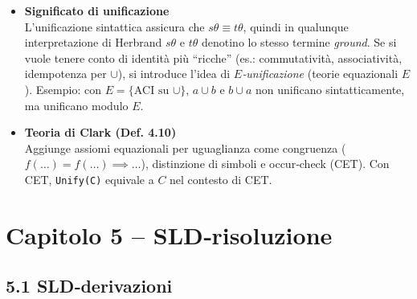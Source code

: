 \documentclass[12pt]{article}
\begin{document}
\begin{itemize}
  \item \textbf{Significato di unificazione}\\
    L’unificazione sintattica assicura che $s\theta \equiv t\theta$, quindi in qualunque interpretazione di Herbrand $s\theta$ e $t\theta$ denotino lo stesso termine \emph{ground}. Se si vuole tenere conto di identità più ``ricche'' (es.: commutatività, associatività, idempotenza per $\cup$), si introduce l’idea di \emph{$E$‐unificazione} (teorie equazionali $E$). Esempio: con $E=\{\text{ACI su }\cup\}$, $a\cup b$ e $b\cup a$ non unificano sintatticamente, ma unificano modulo $E$.

  \item \textbf{Teoria di Clark (Def. 4.10)}\\
    Aggiunge assiomi equazionali per uguaglianza come congruenza ($f(\dots)=f(\dots)\implies \dots$), distinzione di simboli e occur‐check (CET). Con CET, \texttt{Unify(C)} equivale a $C$ nel contesto di CET.
\end{itemize}

\section*{Capitolo 5 – SLD‐risoluzione}

\subsection*{5.1 SLD‐derivazioni}
\end{document}
